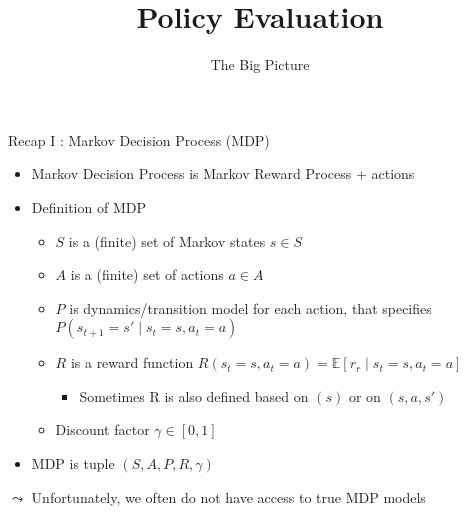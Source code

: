 \documentclass[aspectratio=169]{../latex_main/tntbeamer}  %
\title[Reinforcement Learning: Policy Evaluation]{Policy Evaluation}
\subtitle{The Big Picture}
\begin{document}
	
	\maketitle

\begin{frame}[c]{Recap I : Markov Decision Process (MDP)}

\begin{itemize}
	\item Markov Decision Process is Markov Reward Process + actions
	\item Definition of MDP
	\begin{itemize}
		\item $S$ is a (finite) set of Markov states $s \in S$
		\item $A$ is a (finite) set of actions $a \in A$
		\item $P$ is dynamics/transition model for each action, that specifies $P(s_{t+1} = s' \mid s_t=s, a_t=a)$
		\item $R$ is a reward function 
		$R(s_t=s, a_t=a) = \mathbb{E}[r_r \mid s_t=s, a_t=a] $
		\begin{itemize}
			\item Sometimes R is also defined based on $(s)$ or on $(s,a,s')$
		\end{itemize}
		\item Discount factor $\gamma \in [0, 1]$
	\end{itemize}
	\item MDP is tuple $(S,A,P, R, \gamma)$
\end{itemize}

\pause

\medskip
$\leadsto$ Unfortunately, we often do not have access to true MDP models

\end{frame}
\end{document}
